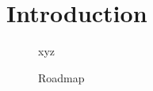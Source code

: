 \chapter{Introduction}\label{ch:introduction}

\begin{figure}
  \centering
  xyz
  \caption{Roadmap}
  \label{fig:roadmap}
\end{figure}

